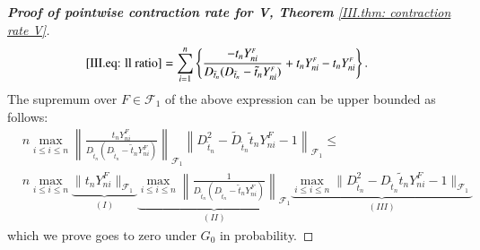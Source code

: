 \begin{proof}[\hypertarget{III.proof contraction pointwise V}{\textbf{Proof of pointwise contraction rate for V, Theorem} \ref{III.thm: contraction rate V}}]
    \begin{align*}
        &\eqref{III.eq: ll ratio} = \sum_{i=1}^n \left\{ \frac{-t_n Y_{ni}^{\scriptscriptstyle{F}}}{D_{\tilde{t}_n} (D_{\tilde{t}_n} - \tilde{t}_n Y_{ni}^{\scriptscriptstyle{F}})} + t_n Y_{ni}^{\scriptscriptstyle{F}} - t_n Y_{ni}^{\scriptscriptstyle{F}} \right\}. 
    \end{align*}
    The supremum over $F \in \mathcal{F}_1$ of the above expression can be upper bounded as follows:
    \begin{align*}
        &n \max_{i \leq i \leq n} \left\| \frac{t_n Y_{ni}^{\scriptscriptstyle{F}}}{D_{\tilde{t}_n} (D_{\tilde{t}_n} - \tilde{t}_n Y_{ni}^{\scriptscriptstyle{F}})} \right\|_{\mathcal{F}_1} \left\| D_{\tilde{t}_n}^2 - \tilde{D}_{\tilde{t}_n} \tilde{t}_n Y_{ni}^{\scriptscriptstyle{F}} - 1 \right\|_{\mathcal{F}_1} \leq \\
        &  n \max_{i \leq i \leq n} \underbrace{\| t_n Y_{ni}^{\scriptscriptstyle{F}} \|_{\mathcal{F}_1}}_{(I)} \underbrace{\max_{i \leq i \leq n} \left\| \frac{1}{D_{\tilde{t}_n} (D_{\tilde{t}_n} - \tilde{t}_n Y_{ni}^{\scriptscriptstyle{F}})} \right\|_{\mathcal{F}_1}}_{(II)} \underbrace{\max_{i \leq i \leq n} \| D_{\tilde{t}_n}^2 - D_{\tilde{t}_n} \tilde{t}_n Y_{ni}^{\scriptscriptstyle{F}} - 1 \|_{\mathcal{F}_1}}_{(III)}
    \end{align*}
    which we prove goes to zero under $G_0$ in probability.


\end{proof}
